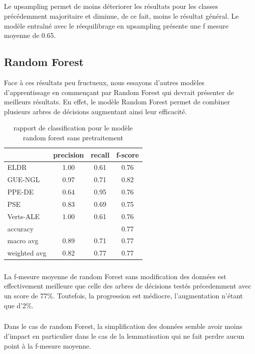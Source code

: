 \documentclass[11pt]{article}
\begin{document}
\subparagraph{}
Le upsampling permet de moins déteriorer les résultats pour les classes précédemment majoritaire et diminue, de ce fait, moins le résultat général. Le modèle entraîné avec le réequilibrage en upsampling présente une f mesure moyenne de 0.65.

\subsection{Random Forest}
Face à ces résultats peu fructueux, nous essayons d'autres modèles d'apprentissage en commençant par Random Forest qui devrait présenter de meilleurs résultats. En effet, le modèle Random Forest permet de combiner plusieurs arbres de décisions augmentant ainsi leur efficacité.


\begin{table}[h]
\centering
\begin{tabular}{lccc}
\hline
 & precision & recall & f-score\\
\hline
ELDR & 1.00 & 0.61 & 0.76\\
GUE-NGL& 0.97 &0.71 & 0.82\\
PPE-DE & 0.64 &0.95 & 0.76\\ 
PSE &  0.83&  0.69 & 0.75\\ 
Verts-ALE &  1.00 & 0.61& 0.76\\
\hline
accuracy& & &    0.77 \\
macro avg &  0.89 &  0.71 &  0.77 \\
weighted avg &  0.82 & 0.77  &  0.77  \\
\hline
\end{tabular}
\caption{rapport de classification pour le modèle random forest sans pretraitement}
\label{tab:randomForest}
\end{table}

\subparagraph{}
La f-mesure moyenne de random Forest sans modification des données est effectivement meilleure que celle des arbres de décisions testés précedemment avec un score de 77\%. Toutefois, la progression est médiocre, l'augmentation n'étant que d'2\%.
\subparagraph{}
Dans le cas de random Forest, la simplification des données semble avoir moins d'impact en particulier dans le cas de la lemmatisation qui ne fait perdre aucun point à la f-mesure moyenne.
\end{document}
